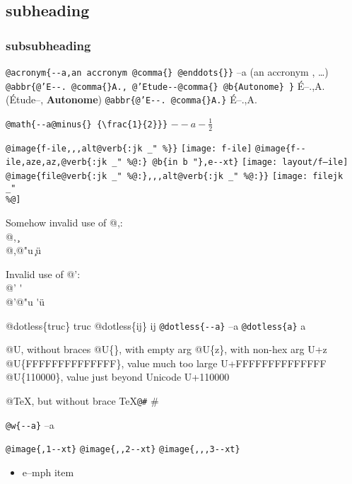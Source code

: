 \documentclass{book}
\newcommand{\GNUTexinfoplaceholder}[1]{}
\newcommand{\GNUTexinfonopagebreakheading}[2]{\let\clearpage\relax \let\cleardoublepage\relax \let\thispagestyle\GNUTexinfoplaceholder #1{#2}}
\renewcommand{\includegraphics}[1]{\fbox{FIG #1}}
\begin{document}
\begin{titlepage}
\GNUTexinfonopagebreakheading{\subsection*}{subheading}

\GNUTexinfonopagebreakheading{\subsubsection*}{subsubheading}


\texttt{@acronym\{{-}{-}a,an accronym @comma\{\} @enddots\{\}\}} --a (an accronym , \dots{})
\texttt{@abbr\{@'E{-}{-}. @comma\{\}A., @'Etude{-}{-}@comma\{\} @b\{Autonome\} \}} \'{E}--.\@ ,A.\@ (\'{E}tude--, \textbf{Autonome})
\texttt{@abbr\{@'E{-}{-}. @comma\{\}A.\}} \'{E}--.\@ ,A.\@

\texttt{@math\{{-}{-}a@minus\{\} \{\textbackslash{}frac\{1\}\{2\}\}\}} $--a- {\frac{1}{2}}$

\texttt{@image\{f-ile,,,alt@verb\{:jk \_" \%\@\}\}} \texttt{[image: f-ile]}
\texttt{@image\{f{-}{-}ile,aze,az,@verb\{:jk \_" \%@:\} @b\{in b "\},e{-}{-}xt\}} \texttt{[image: layout/f--ile]}
\texttt{@image\{file@verb\{:jk \_" \%@:\},,,alt@verb\{:jk \_" \%@:\}\}} \texttt{[image: filejk \\\_" \\\%@]}




Somehow invalid use of @,:\leavevmode{}\\
@, \c{}
\leavevmode{}\\
@,@"u \c{}\"{u}

Invalid use of @':\leavevmode{}\\
@' \'{}
\leavevmode{}\\
@'@"u \'{}\"{u}

@dotless\{truc\} truc
@dotless\{ij\} ij
\texttt{@dotless\{{-}{-}a\}} --a
\texttt{@dotless\{a\}} a

@U, without braces @U\{\}, with empty arg 
@U\{z\}, with non-hex arg U+z
@U\{FFFFFFFFFFFFFF\}, value much too large U+FFFFFFFFFFFFFF
@U\{110000\}, value just beyond Unicode U+110000

@TeX, but without brace \TeX{}\texttt{@\#} \#

\texttt{@w\{{-}{-}a\}} \hbox{--a}

\texttt{@image\{,1{-}{-}xt\}} 
\texttt{@image\{,,2{-}{-}xt\}} 
\texttt{@image\{,,,3{-}{-}xt\}} 


\begin{itemize}[label=\emph{}]
\item e--mph item
\end{itemize}


\end{titlepage}
\end{document}

